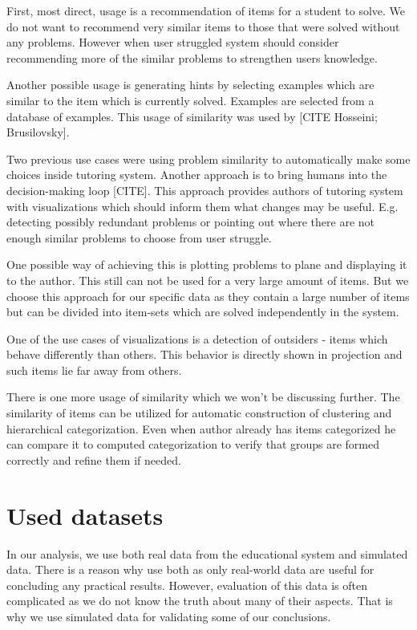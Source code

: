 \documentclass[
  digital, %
  table,   %
  nolof,     %
  nolot,     %
  nocover
]{fithesis3}
\begin{document}
First, most direct, usage is a recommendation of items for a student to solve. We do not want to recommend very similar items to those that were solved without any problems. However when user struggled system should consider recommending more of the similar problems to strengthen users knowledge.

Another possible usage is generating hints by selecting examples which are similar to the item which is currently solved. Examples are selected from a database of examples. This usage of similarity was used by [CITE Hosseini; Brusilovsky].

Two previous use cases were using problem similarity to automatically make some choices inside tutoring system. Another approach is to bring humans into the decision-making loop [CITE]. This approach provides authors of tutoring system with visualizations which should inform them what changes may be useful. E.g. detecting possibly redundant problems or pointing out where there are not enough similar problems to choose from user struggle.

One possible way of achieving this is plotting problems to plane and displaying it to the author. This still can not be used for a very large amount of items. But we choose this approach for our specific data as they contain a large number of items but can be divided into item-sets which are solved independently in the system.

One of the use cases of visualizations is a detection of outsiders - items which behave differently than others. This behavior is directly shown in projection and such items lie far away from others.

There is one more usage of similarity which we won't be discussing further. The similarity of items can be utilized for automatic construction of clustering and hierarchical categorization. Even when author already has items categorized he can compare it to computed categorization to verify that groups are formed correctly and refine them if needed.

\chapter{Used datasets}\label{used-datasets}



In our analysis, we use both real data from the educational system and simulated data. There is a reason why use both as only real-world data are useful for concluding any practical results. However, evaluation of this data
is often complicated as we do not know the truth about many of their aspects. That is why we use simulated data for validating some of our conclusions.
\end{document}
